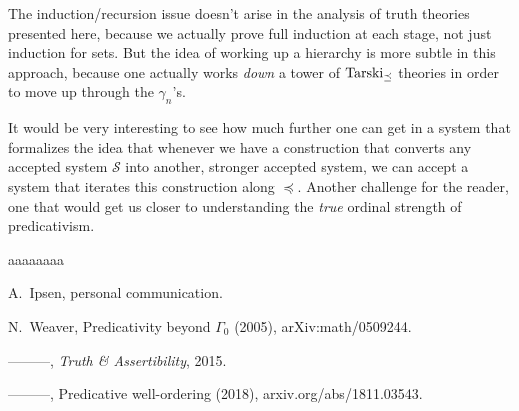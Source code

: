 \documentclass{amsart}
\begin{document}
The induction/recursion issue doesn't arise in the analysis of truth theories presented here, because we
actually prove full induction at each stage, not just induction for sets. But the idea of working up a hierarchy
is more subtle in this approach, because one actually works {\it down} a tower of ${\rm Tarski}_{\preceq}$
theories in order to move up through the $\gamma_n$'s.

It would be very interesting to see how much further one can get in a system that formalizes the idea that
whenever we have a construction that converts any accepted system $\mathcal{S}$ into another, stronger
accepted system, we can accept a system that iterates this construction along $\preceq$. Another challenge
for the reader, one that would get us closer to understanding the {\it true} ordinal strength of predicativism.

\begin{thebibliography}{aaaaaaaa}

A.\ Ipsen, personal communication.

N.\ Weaver, Predicativity beyond $\Gamma_0$ (2005), arXiv:math/0509244.

{---------}, {\it Truth \& Assertibility}, 2015.

{---------}, Predicative well-ordering (2018), arxiv.org/abs/1811.03543.

\end{thebibliography}
\end{document}
